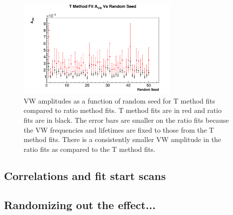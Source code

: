 \documentclass[12pt,letterpaper]{article}
\begin{document}
\begin{figure}[]
    \centering
    \includegraphics[width=0.7\textwidth]{vw-fixed-w-tau-9d-randseeds}
    \caption[]{VW amplitudes as a function of random seed for T method fits compared to ratio method fits. T method fits are in red and ratio fits are in black. The error bars are smaller on the ratio fits because the VW frequencies and lifetimes are fixed to those from the T method fits. There is a consistently smaller VW amplitude in the ratio fits as compared to the T method fits.}
    \label{fig:vw-fixed-w-tau-9d-randseeds}
\end{figure}


\subsection*{Correlations and fit start scans}




\subsection*{Randomizing out the effect...}







\end{document}
